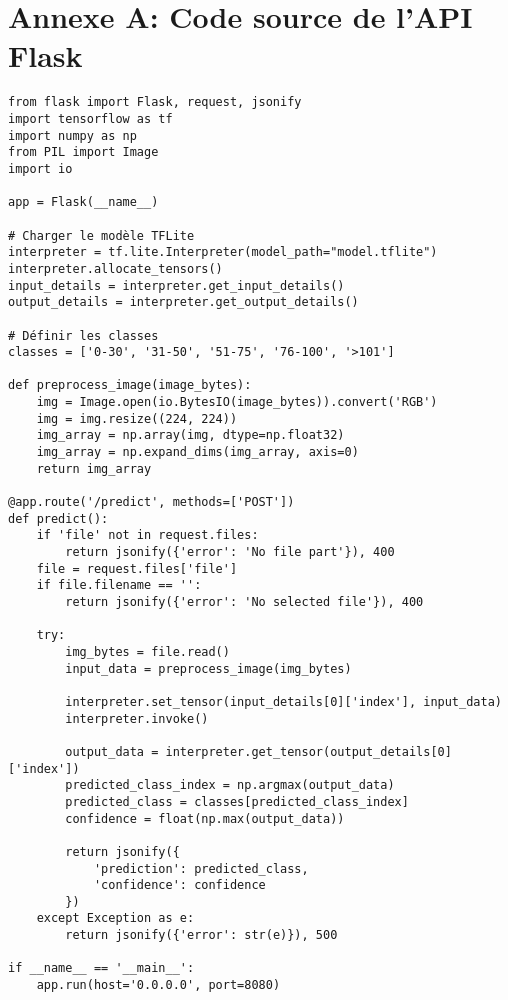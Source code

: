 \documentclass[12pt,a4paper]{report}
\begin{document}
\section*{Annexe A: Code source de l’API Flask}
\begin{verbatim}
from flask import Flask, request, jsonify
import tensorflow as tf
import numpy as np
from PIL import Image
import io

app = Flask(__name__)

# Charger le modèle TFLite
interpreter = tf.lite.Interpreter(model_path="model.tflite")
interpreter.allocate_tensors()
input_details = interpreter.get_input_details()
output_details = interpreter.get_output_details()

# Définir les classes
classes = ['0-30', '31-50', '51-75', '76-100', '>101']

def preprocess_image(image_bytes):
    img = Image.open(io.BytesIO(image_bytes)).convert('RGB')
    img = img.resize((224, 224))
    img_array = np.array(img, dtype=np.float32)
    img_array = np.expand_dims(img_array, axis=0)
    return img_array

@app.route('/predict', methods=['POST'])
def predict():
    if 'file' not in request.files:
        return jsonify({'error': 'No file part'}), 400
    file = request.files['file']
    if file.filename == '':
        return jsonify({'error': 'No selected file'}), 400

    try:
        img_bytes = file.read()
        input_data = preprocess_image(img_bytes)

        interpreter.set_tensor(input_details[0]['index'], input_data)
        interpreter.invoke()

        output_data = interpreter.get_tensor(output_details[0]['index'])
        predicted_class_index = np.argmax(output_data)
        predicted_class = classes[predicted_class_index]
        confidence = float(np.max(output_data))

        return jsonify({
            'prediction': predicted_class,
            'confidence': confidence
        })
    except Exception as e:
        return jsonify({'error': str(e)}), 500

if __name__ == '__main__':
    app.run(host='0.0.0.0', port=8080)
\end{verbatim}
\end{document}
